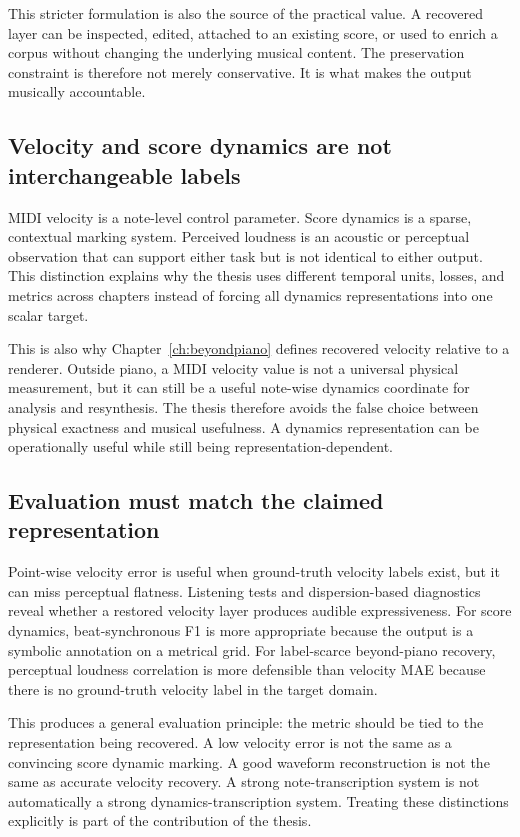 This stricter formulation is also the source of the practical value. A recovered layer can be inspected, edited, attached to an existing score, or used to enrich a corpus without changing the underlying musical content. The preservation constraint is therefore not merely conservative. It is what makes the output musically accountable.

\subsection{Velocity and score dynamics are not interchangeable labels}
\label{ssec:conclusion:representation}

MIDI velocity is a note-level control parameter. Score dynamics is a sparse, contextual marking system. Perceived loudness is an acoustic or perceptual observation that can support either task but is not identical to either output. This distinction explains why the thesis uses different temporal units, losses, and metrics across chapters instead of forcing all dynamics representations into one scalar target.

This is also why Chapter~\ref{ch:beyondpiano} defines recovered velocity relative to a renderer. Outside piano, a MIDI velocity value is not a universal physical measurement, but it can still be a useful note-wise dynamics coordinate for analysis and resynthesis. The thesis therefore avoids the false choice between physical exactness and musical usefulness. A dynamics representation can be operationally useful while still being representation-dependent.

\subsection{Evaluation must match the claimed representation}
\label{ssec:conclusion:evaluation}

Point-wise velocity error is useful when ground-truth velocity labels exist, but it can miss perceptual flatness. Listening tests and dispersion-based diagnostics reveal whether a restored velocity layer produces audible expressiveness. For score dynamics, beat-synchronous F1 is more appropriate because the output is a symbolic annotation on a metrical grid. For label-scarce beyond-piano recovery, perceptual loudness correlation is more defensible than velocity MAE because there is no ground-truth velocity label in the target domain.

This produces a general evaluation principle: the metric should be tied to the representation being recovered. A low velocity error is not the same as a convincing score dynamic marking. A good waveform reconstruction is not the same as accurate velocity recovery. A strong note-transcription system is not automatically a strong dynamics-transcription system. Treating these distinctions explicitly is part of the contribution of the thesis.

